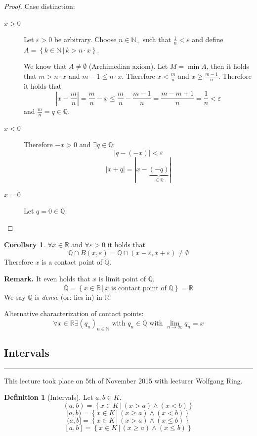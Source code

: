 \documentclass[a4paper,landscape,twocolumn]{article}
\theoremstyle{definition}
\newtheorem{defi}{Definition}
\newtheorem{cor}{Corollary}
\newcommand\setdef[2]{\left\{#1\,|\,#2\right\}}
\newcommand\abs[1]{\left|#1\right|}
\newcommand\meta[3]{\hrule{} This #1 took place on #2 with lecturer #3.\par}
\begin{document}
\begin{proof}
  Case distinction:
  \begin{description}
    \item[$x > 0$]
      Let $\varepsilon > 0$ be arbitrary.
      Choose $n \in \mathbb N_+$ such that $\frac1n < \varepsilon$
      and define $A = \setdef{k \in \mathbb N}{k > n \cdot x}$.

      We know that $A \neq \emptyset$ (Archimedian axiom).
      Let $M = \min{A}$, then it holds that $m > n \cdot x$ and $m - 1 \leq n \cdot x$.
      Therefore $x < \frac mn$ and $x \geq \frac{m-1}{n}$.
      Therefore it holds that
      \[
        \abs{x - \frac mn} = \frac mn - x \leq \frac mn - \frac{m-1}{n}
        = \frac{m - m + 1}{n} = \frac 1n < \varepsilon
      \]
      and $\frac mn = q \in \mathbb Q$.
    \item[$x < 0$]
      Therefore $-x > 0$ and $\exists q \in \mathbb Q$:
      \[ \abs{q - (-x)} < \varepsilon \]
      \[ \abs{x + q} = \abs{x - \underbrace{(-q)}_{\in \mathbb Q}} \]
    \item[$x = 0$]
      Let $q = 0 \in \mathbb Q$.
  \end{description}
\end{proof}
\begin{cor}
  $\forall x \in \mathbb R$ and $\forall \varepsilon > 0$ it holds that
  \[
    \mathbb Q \cap B(x, \varepsilon)
    = \mathbb Q \cap (x - \varepsilon, x + \varepsilon)
    \neq \emptyset
  \]
  Therefore $x$ is a contact point of $\mathbb Q$.

  \textbf{Remark.}
  It even holds that $x$ is limit point of $\mathbb Q$.
  \[
    \overline{\mathbb Q}
      = \setdef{x \in \mathbb R}{x \text{ is contact point of } \mathbb Q}
      = \mathbb R
  \]
  We say $\mathbb Q$ is \emph{dense} (or: lies in) in $\mathbb R$.

  Alternative characterization of contact points:
  \[
    \forall x \in \mathbb R \exists (q_n)_{n \in \mathbb N}
    \text{ with } q_n \in \mathbb Q
    \text{ with } \lim_{n \to \infty} q_n = x
  \]
\end{cor}

\subsection{Intervals}
\meta{lecture}{5th of November 2015}{Wolfgang Ring}

\begin{defi}[Intervals]
  Let $a, b \in K$.
  \[ (a,b) = \setdef{x \in K}{(x > a) \land (x < b)} \]
  \[ [a, b) = \setdef{x \in K}{(x \geq a) \land (x < b)} \]
  \[ (a, b] = \setdef{x \in K}{(x > a) \land (x \leq b)} \]
  \[ [a, b] = \setdef{x \in K}{(x \geq a) \land (x \leq b)} \]
\end{defi}
\end{document}
